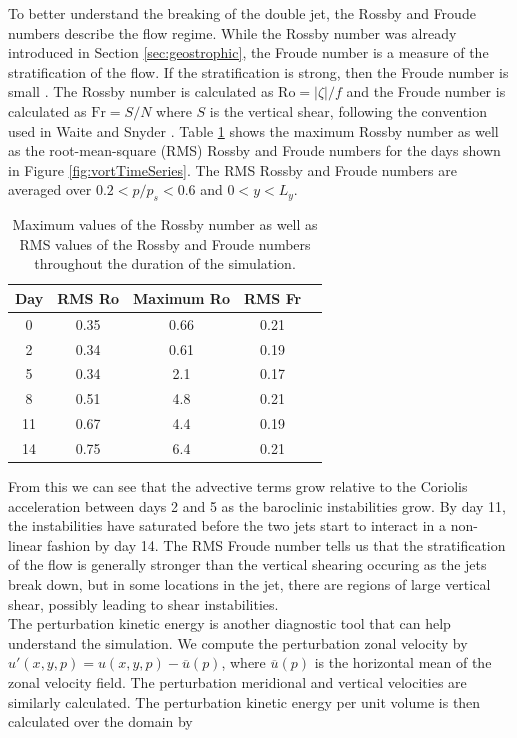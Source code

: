 To better understand the breaking of the double jet, the Rossby and Froude numbers describe the flow regime. While the Rossby number was already introduced in Section \ref{sec:geostrophic}, the Froude number is a measure of the stratification of the flow. If the stratification is strong, then the Froude number is small \cite{Vallis2006}. The Rossby number is calculated as $\text{Ro} = |\zeta|/f$ and the Froude number is calculated as $\text{Fr} = S/N$ where $S$ is the vertical shear, following the convention used in Waite and Snyder \cite{Waite2009}. Table \ref{tab:RoFr} shows the maximum Rossby number as well as the root-mean-square (RMS) Rossby and Froude numbers for the days shown in Figure \ref{fig:vortTimeSeries}. The RMS Rossby and Froude numbers are averaged over $0.2 < p/p_s < 0.6$ and $0 < y < L_y$. 

\begin{table}[H]
\centering
\begin{tabular}{|c|c|c|c|c|}
\hline
\textbf{Day} & \textbf{RMS Ro} & \textbf{Maximum Ro} & \textbf{RMS Fr}\\ \hline
0 & 0.35 & 0.66 & 0.21 \\ \hline
2 & 0.34 & 0.61 & 0.19  \\ \hline
5 & 0.34 & 2.1 & 0.17 \\ \hline
8 & 0.51 & 4.8 & 0.21 \\ \hline
11 & 0.67 & 4.4 & 0.19  \\ \hline
14 & 0.75 & 6.4  & 0.21 \\ \hline
\end{tabular}
\caption{Maximum values of the Rossby number as well as RMS values of the Rossby and Froude numbers throughout the duration of the simulation.}
\label{tab:RoFr}
\end{table}

From this we can see that the advective terms grow relative to the Coriolis acceleration between days 2 and 5 as the baroclinic instabilities grow. By day 11, the instabilities have saturated before the two jets start to interact in a non-linear fashion by day 14. The RMS Froude number tells us that the stratification of the flow is generally stronger than the vertical shearing occuring as the jets break down, but in some locations in the jet, there are regions of large vertical shear, possibly leading to shear instabilities.\\

The perturbation kinetic energy is another diagnostic tool that can help understand the simulation. We compute the perturbation zonal velocity by $u'(x,y,p) = u(x,y,p) - \overline{u}(p)$, where $\overline{u}(p)$ is the horizontal mean of the zonal velocity field. The perturbation meridional and vertical velocities are similarly calculated. The perturbation kinetic energy per unit volume is then calculated over the domain by

